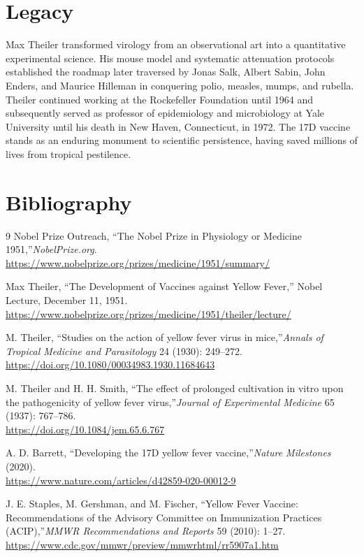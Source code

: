 \section{Legacy}

Max Theiler transformed virology from an observational art into a quantitative experimental science. His mouse model and systematic attenuation protocols established the roadmap later traversed by Jonas Salk, Albert Sabin, John Enders, and Maurice Hilleman in conquering polio, measles, mumps, and rubella. Theiler continued working at the Rockefeller Foundation until 1964 and subsequently served as professor of epidemiology and microbiology at Yale University until his death in New Haven, Connecticut, in 1972. The 17D vaccine stands as an enduring monument to scientific persistence, having saved millions of lives from tropical pestilence.

\section{Bibliography}

\begin{thebibliography}{9}
Nobel Prize Outreach, ``The Nobel Prize in Physiology or Medicine 1951,''\emph{NobelPrize.org}.\\
\url{https://www.nobelprize.org/prizes/medicine/1951/summary/}

Max Theiler, ``The Development of Vaccines against Yellow Fever,'' Nobel Lecture, December 11, 1951.\\
\url{https://www.nobelprize.org/prizes/medicine/1951/theiler/lecture/}

M. Theiler, ``Studies on the action of yellow fever virus in mice,''\emph{Annals of Tropical Medicine and Parasitology} 24 (1930): 249--272.\\
\url{https://doi.org/10.1080/00034983.1930.11684643}

M. Theiler and H. H. Smith, ``The effect of prolonged cultivation in vitro upon the pathogenicity of yellow fever virus,''\emph{Journal of Experimental Medicine} 65 (1937): 767--786.\\
\url{https://doi.org/10.1084/jem.65.6.767}

A. D. Barrett, ``Developing the 17D yellow fever vaccine,''\emph{Nature Milestones} (2020).\\
\url{https://www.nature.com/articles/d42859-020-00012-9}

J. E. Staples, M. Gershman, and M. Fischer, ``Yellow Fever Vaccine: Recommendations of the Advisory Committee on Immunization Practices (ACIP),''\emph{MMWR Recommendations and Reports} 59 (2010): 1--27.\\
\url{https://www.cdc.gov/mmwr/preview/mmwrhtml/rr5907a1.htm}
\end{thebibliography}
